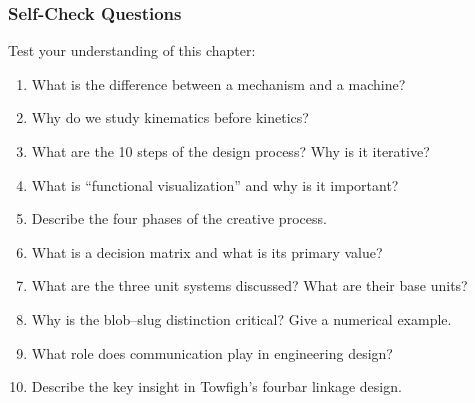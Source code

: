 \documentclass[10pt,aspectratio=43]{beamer}
\begin{document}
\begin{frame}
\frametitle{Self-Check Questions}

Test your understanding of this chapter:

\begin{enumerate}
  \item What is the difference between a mechanism and a machine?
  \item Why do we study kinematics before kinetics?
  \item What are the 10 steps of the design process? Why is it iterative?
  \item What is ``functional visualization'' and why is it important?
  \item Describe the four phases of the creative process.
  \item What is a decision matrix and what is its primary value?
  \item What are the three unit systems discussed? What are their base units?
  \item Why is the blob--slug distinction critical? Give a numerical example.
  \item What role does communication play in engineering design?
  \item Describe the key insight in Towfigh's fourbar linkage design.
\end{enumerate}

\end{frame}
\end{document}
